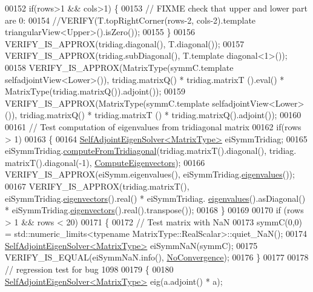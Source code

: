 \begin{DoxyCode}
00152   \textcolor{keywordflow}{if}(rows>1 && cols>1) \{
00153     \textcolor{comment}{// FIXME check that upper and lower part are 0:}
00154     \textcolor{comment}{//VERIFY(T.topRightCorner(rows-2, cols-2).template triangularView<Upper>().isZero());}
00155   \}
00156   VERIFY\_IS\_APPROX(tridiag.diagonal(), T.diagonal());
00157   VERIFY\_IS\_APPROX(tridiag.subDiagonal(), T.template diagonal<1>());
00158   VERIFY\_IS\_APPROX(MatrixType(symmC.template selfadjointView<Lower>()), tridiag.matrixQ() * tridiag.matrixT
      ().eval() * MatrixType(tridiag.matrixQ()).adjoint());
00159   VERIFY\_IS\_APPROX(MatrixType(symmC.template selfadjointView<Lower>()), tridiag.matrixQ() * tridiag.matrixT
      () * tridiag.matrixQ().adjoint());
00160   
00161   \textcolor{comment}{// Test computation of eigenvalues from tridiagonal matrix}
00162   \textcolor{keywordflow}{if}(rows > 1)
00163   \{
00164     \hyperlink{group___eigenvalues___module_class_eigen_1_1_self_adjoint_eigen_solver}{SelfAdjointEigenSolver<MatrixType>} eiSymmTridiag;
00165     eiSymmTridiag.\hyperlink{group___eigenvalues___module_a297893df7098c43278d385e4d4e23fe4}{computeFromTridiagonal}(tridiag.matrixT().diagonal(), tridiag.
      matrixT().diagonal(-1), \hyperlink{group__enums_ggae3e239fb70022eb8747994cf5d68b4a9ada93d8885bde32b876ba4af01d3292cc}{ComputeEigenvectors});
00166     VERIFY\_IS\_APPROX(eiSymm.eigenvalues(), eiSymmTridiag.\hyperlink{group___eigenvalues___module_a8efab27e82aa6aa0ae0c64739238c2e0}{eigenvalues}());
00167     VERIFY\_IS\_APPROX(tridiag.matrixT(), eiSymmTridiag.\hyperlink{group___eigenvalues___module_a7b9f7e641fa46ac4c5f2371405c69b2b}{eigenvectors}().real() * eiSymmTridiag.
      \hyperlink{group___eigenvalues___module_a8efab27e82aa6aa0ae0c64739238c2e0}{eigenvalues}().asDiagonal() * eiSymmTridiag.\hyperlink{group___eigenvalues___module_a7b9f7e641fa46ac4c5f2371405c69b2b}{eigenvectors}().real().transpose());
00168   \}
00169 
00170   \textcolor{keywordflow}{if} (rows > 1 && rows < 20)
00171   \{
00172     \textcolor{comment}{// Test matrix with NaN}
00173     symmC(0,0) = std::numeric\_limits<typename MatrixType::RealScalar>::quiet\_NaN();
00174     \hyperlink{group___eigenvalues___module_class_eigen_1_1_self_adjoint_eigen_solver}{SelfAdjointEigenSolver<MatrixType>} eiSymmNaN(symmC);
00175     VERIFY\_IS\_EQUAL(eiSymmNaN.info(), \hyperlink{group__enums_gga85fad7b87587764e5cf6b513a9e0ee5eaba1c8763d1179778070f365ecc4157a8}{NoConvergence});
00176   \}
00177 
00178   \textcolor{comment}{// regression test for bug 1098}
00179   \{
00180     \hyperlink{group___eigenvalues___module_class_eigen_1_1_self_adjoint_eigen_solver}{SelfAdjointEigenSolver<MatrixType>} eig(a.adjoint() * a);

\end{DoxyCode}
